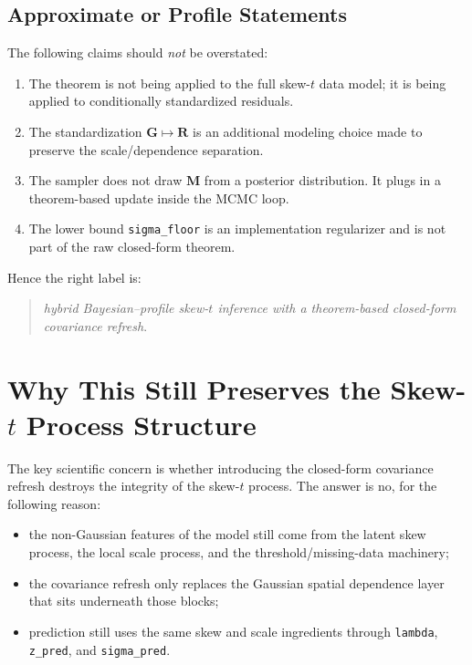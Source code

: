 \documentclass[11pt]{article}
\newcommand{\bR}{\mathbf{R}}
\newcommand{\bG}{\mathbf{G}}
\newcommand{\bM}{\mathbf{M}}
\begin{document}
\subsection{Approximate or Profile Statements}

The following claims should \emph{not} be overstated:

\begin{enumerate}[label=\arabic*.]
\item The theorem is not being applied to the full skew-$t$ data model; it is
being applied to conditionally standardized residuals.
\item The standardization \(\bG \mapsto \bR\) is an additional modeling choice
made to preserve the scale/dependence separation.
\item The sampler does not draw \(\bM\) from a posterior distribution. It plugs
in a theorem-based update inside the MCMC loop.
\item The lower bound \texttt{sigma\_floor} is an implementation regularizer and
is not part of the raw closed-form theorem.
\end{enumerate}

Hence the right label is:

\begin{quote}
\emph{hybrid Bayesian--profile skew-$t$ inference with a theorem-based
closed-form covariance refresh}.
\end{quote}

\section{Why This Still Preserves the Skew-\texorpdfstring{$t$}{t} Process Structure}

The key scientific concern is whether introducing the closed-form covariance
refresh destroys the integrity of the skew-$t$ process. The answer is no, for
the following reason:

\begin{itemize}
\item the non-Gaussian features of the model still come from the latent skew
process, the local scale process, and the threshold/missing-data machinery;
\item the covariance refresh only replaces the Gaussian spatial dependence layer
that sits underneath those blocks;
\item prediction still uses the same skew and scale ingredients through
\texttt{lambda}, \texttt{z\_pred}, and \texttt{sigma\_pred}.
\end{itemize}
\end{document}
